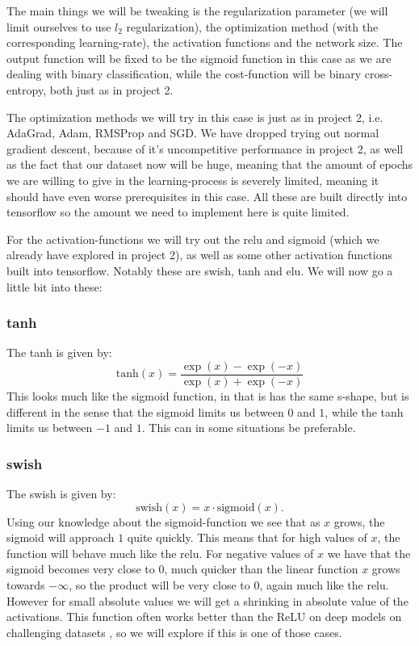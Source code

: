 \documentclass{article}
\begin{document}
The main things we will be tweaking is the regularization parameter (we will
limit ourselves to use $l_2$ regularization), the optimization method (with the
corresponding learning-rate), the activation functions and the network size.
The output function will be fixed to be the sigmoid function in this case as we
are dealing with binary classification, while the cost-function will be binary
cross-entropy, both just as in project 2.

The optimization methods we will try in this case is just as in project 2, i.e.
AdaGrad, Adam, RMSProp and SGD. We have dropped trying out normal gradient
descent, because of it's uncompetitive performance in project 2, as well as the
fact that our dataset now will be huge, meaning that the amount of epochs we
are willing to give in the learning-process is severely limited, meaning it
should have even worse prerequisites in this case. All these are built directly
into tensorflow so the amount we need to implement here is quite limited.

For the activation-functions we will try out the relu and sigmoid (which we
already have explored in project 2), as well as some other activation functions
built into tensorflow. Notably these are swish, tanh and elu. We will now go a
little bit into these:
\subsubsection{tanh}
The tanh is given by:
$$\text{tanh}(x) = \frac{\exp(x) - \exp(-x)}{\exp(x) + \exp(-x)}$$ \cite{wikihyperbolicfunctions}
This looks much like the sigmoid function, in that is has the same s-shape, but
is different in the sense that the sigmoid limits us between $0$ and $1$, while
the tanh limits us between $-1$ and $1$. This can in some situations be
preferable.

\subsubsection{swish}
The swish is given by:
$$\text{swish}(x) = x \cdot \text{sigmoid}(x).$$ \cite{tensorflowdocswish}
Using our knowledge about the sigmoid-function we see that as $x$ grows, the
sigmoid will approach $1$ quite quickly. This means that for high values of
$x$, the function will behave much like the relu. For negative values of $x$ we
have that the sigmoid becomes very close to $0$, much quicker than the linear
function $x$ grows towards $-\infty$, so the product will be very close to $0$,
again much like the relu. However for small absolute values we will get a
shrinking in absolute value of the activations. This function often works
better than the ReLU on deep models on challenging datasets
\cite{ramachandran2017searching}, so we will explore if this is one of those
cases.
\end{document}
